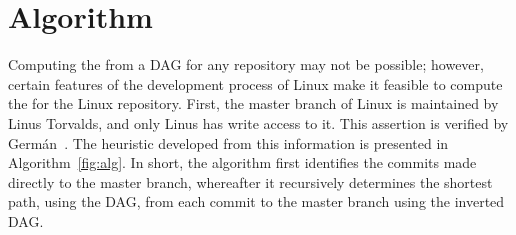 \section{Algorithm}
\label{sec:algorithm}

Computing the \mt from a DAG for any repository may not be possible;
however, certain features of the development process of Linux make it
feasible to compute the \mt for the Linux repository. First, the master
branch of Linux is maintained by Linus Torvalds, and only Linus has
write access to it. This assertion is verified by
Germán~\cite{German2015}. The heuristic developed from this information
is presented in Algorithm~\ref{fig:alg}. In short, the algorithm first
identifies the commits made directly to the master branch, whereafter it
recursively determines the shortest path, using the DAG, from each
commit to the master branch using the inverted DAG\@.

